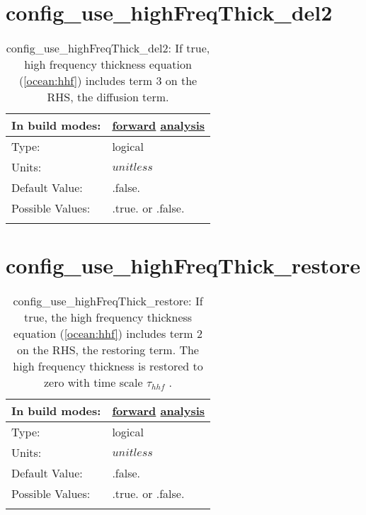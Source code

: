 \section[config\_use\_highFreqThick\_del2]{config\_use\_highFreqThick\_del2}
\label{sec:nm_sec_config_use_highFreqThick_del2}
\begin{center}
\begin{longtable}{| p{2.0in} || p{4.0in} |}
    \hline
    In build modes: & \hyperref[subsec:forward_nm_tab_ALE_frequency_filtered_thickness]{forward} \hyperref[subsec:analysis_nm_tab_ALE_frequency_filtered_thickness]{analysis} \\
    \hline
    Type: & logical \\
    \hline
    Units: & $unitless$ \\
    \hline
    Default Value: & .false. \\
    \hline
    Possible Values: & .true. or .false. \\
    \hline
    \caption{config\_use\_highFreqThick\_del2: If true, high frequency thickness equation (\ref{ocean:hhf}) includes term 3 on the RHS, the diffusion term.}
\end{longtable}
\end{center}
\section[config\_use\_highFreqThick\_restore]{config\_use\_highFreqThick\_restore}
\label{sec:nm_sec_config_use_highFreqThick_restore}
\begin{center}
\begin{longtable}{| p{2.0in} || p{4.0in} |}
    \hline
    In build modes: & \hyperref[subsec:forward_nm_tab_ALE_frequency_filtered_thickness]{forward} \hyperref[subsec:analysis_nm_tab_ALE_frequency_filtered_thickness]{analysis} \\
    \hline
    Type: & logical \\
    \hline
    Units: & $unitless$ \\
    \hline
    Default Value: & .false. \\
    \hline
    Possible Values: & .true. or .false. \\
    \hline
    \caption{config\_use\_highFreqThick\_restore:  If true, the high frequency thickness equation (\ref{ocean:hhf}) includes term 2 on the RHS, the restoring term.  The high frequency thickness is restored to zero with time scale  $\tau_{hhf}$ .}
\end{longtable}
\end{center}

